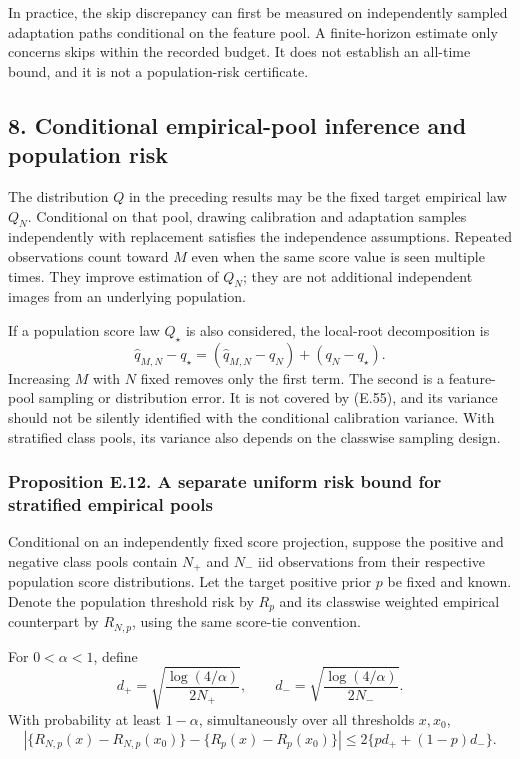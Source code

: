 In practice, the skip discrepancy can first be measured on independently
sampled adaptation paths conditional on the feature pool. A
finite-horizon estimate only concerns skips within the recorded budget.
It does not establish an all-time bound, and it is not a population-risk
certificate.

\subsection{8. Conditional empirical-pool inference and population
risk}\label{risk_boundaries-conditional-empirical-pool-inference-and-population-risk}

The distribution \(Q\) in the preceding results may be the fixed target
empirical law \(Q_N\). Conditional on that pool, drawing calibration and
adaptation samples independently with replacement satisfies the
independence assumptions. Repeated observations count toward \(M\) even
when the same score value is seen multiple times. They improve
estimation of \(Q_N\); they are not additional independent images from
an underlying population.

If a population score law \(Q_\star\) is also considered, the local-root
decomposition is \[
\widehat q_{M,N}-q_\star
=(\widehat q_{M,N}-q_N)+(q_N-q_\star).
\tag{E.79}
\] Increasing \(M\) with \(N\) fixed removes only the first term. The
second is a feature-pool sampling or distribution error. It is not
covered by (E.55), and its variance should not be silently identified
with the conditional calibration variance. With stratified class pools,
its variance also depends on the classwise sampling design.

\subsubsection{Proposition E.12. A separate uniform risk bound for
stratified empirical
pools}\label{risk_boundaries-proposition-e.12.-a-separate-uniform-risk-bound-for-stratified-empirical-pools}

Conditional on an independently fixed score projection, suppose the
positive and negative class pools contain \(N_+\) and \(N_-\) iid
observations from their respective population score distributions. Let
the target positive prior \(p\) be fixed and known. Denote the
population threshold risk by \(R_p\) and its classwise weighted
empirical counterpart by \(R_{N,p}\), using the same score-tie
convention.

For \(0<\alpha<1\), define \[
d_+=\sqrt{\frac{\log(4/\alpha)}{2N_+}},
\qquad
d_-=\sqrt{\frac{\log(4/\alpha)}{2N_-}}.
\tag{E.80}
\] With probability at least \(1-\alpha\), simultaneously over all
thresholds \(x,x_0\), \[
\left|
\{R_{N,p}(x)-R_{N,p}(x_0)\}
-\{R_p(x)-R_p(x_0)\}
\right|
\le2\{p d_++(1-p)d_-\}.
\tag{E.81}
\]

